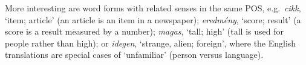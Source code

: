 \documentclass[11pt]{article}
\newcommand{\todo}[1]{}
\newcommand{\paprika}{
\begin{figure}
\texttt{[image: paprika]}
\end{figure}
}
\begin{document}


More interesting are word forms with related senses in the same POS,
e.g.~\emph{cikk}, `item; article' (an article is an item in a newspaper);
\emph{eredmény}, `score; result' (a score is a result measured by a number);
\emph{magas}, `tall; high' (tall is used for people rather than high); or
\emph{idegen}, `strange, alien; foreign', where the English translations are
special cases of `unfamiliar' (person versus language).


\todo{missing sense \\ édes [['sweetheart'], ['cute \\
  közvetlen [['informal'], ['casual}
\end{document}
